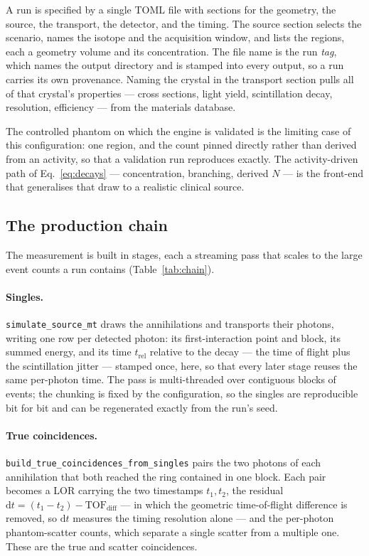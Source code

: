 \documentclass[11pt]{article}
\begin{document}
A run is specified by a single TOML file with sections for the geometry, the source, the transport,
the detector, and the timing. The source section selects the scenario, names the isotope and the
acquisition window, and lists the regions, each a geometry volume and its concentration. The file
name is the run \emph{tag}, which names the output directory and is stamped into every output, so a
run carries its own provenance. Naming the crystal in the transport section pulls all of that
crystal's properties --- cross sections, light yield, scintillation decay, resolution, efficiency ---
from the materials database.

The controlled phantom on which the engine is validated is the limiting case of this configuration:
one region, and the count pinned directly rather than derived from an activity, so that a validation
run reproduces exactly. The activity-driven path of Eq.~\eqref{eq:decays} --- concentration,
branching, derived $N$ --- is the front-end that generalises that draw to a realistic clinical
source.

\subsection{The production chain}

The measurement is built in stages, each a streaming pass that scales to the large event counts a run
contains (Table~\ref{tab:chain}).

\paragraph{Singles.} \texttt{simulate\_source\_mt} draws the annihilations and transports their
photons, writing one row per detected photon: its first-interaction point and block, its summed
energy, and its time $t_{\mathrm{rel}}$ relative to the decay --- the time of flight plus the
scintillation jitter --- stamped once, here, so that every later stage reuses the same per-photon
time. The pass is multi-threaded over contiguous blocks of events; the chunking is fixed by the
configuration, so the singles are reproducible bit for bit and can be regenerated exactly from the
run's seed.

\paragraph{True coincidences.} \texttt{build\_true\_coincidences\_from\_singles} pairs the two photons
of each annihilation that both reached the ring contained in one block. Each pair becomes a LOR
carrying the two timestamps $t_1, t_2$, the residual
$\mathrm{d}t = (t_1 - t_2) - \mathrm{TOF_{diff}}$ --- in which the geometric time-of-flight difference
is removed, so $\mathrm{d}t$ measures the timing resolution alone --- and the per-photon
phantom-scatter counts, which separate a single scatter from a multiple one. These are the true and
scatter coincidences.
\end{document}
